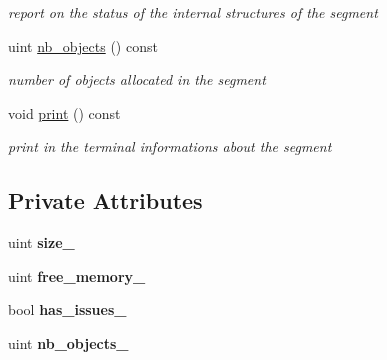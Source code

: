 \begin{DoxyCompactItemize}
\begin{DoxyCompactList}\small\item\em report on the status of the internal structures of the segment \end{DoxyCompactList}\item 
uint \hyperlink{classshared__memory_1_1SegmentInfo_aa1ecf75582e0df02205ad80c2797bc94}{nb\+\_\+objects} () const \hypertarget{classshared__memory_1_1SegmentInfo_aa1ecf75582e0df02205ad80c2797bc94}{}\label{classshared__memory_1_1SegmentInfo_aa1ecf75582e0df02205ad80c2797bc94}

\begin{DoxyCompactList}\small\item\em number of objects allocated in the segment \end{DoxyCompactList}\item 
void \hyperlink{classshared__memory_1_1SegmentInfo_a821eb6fc85451b03ea862e4cf5d6890c}{print} () const \hypertarget{classshared__memory_1_1SegmentInfo_a821eb6fc85451b03ea862e4cf5d6890c}{}\label{classshared__memory_1_1SegmentInfo_a821eb6fc85451b03ea862e4cf5d6890c}

\begin{DoxyCompactList}\small\item\em print in the terminal informations about the segment \end{DoxyCompactList}\end{DoxyCompactItemize}
\subsection*{Private Attributes}
\begin{DoxyCompactItemize}
\item 
uint {\bfseries size\+\_\+}\hypertarget{classshared__memory_1_1SegmentInfo_a87f1d90b4bfefd07945ba0e7d42959f4}{}\label{classshared__memory_1_1SegmentInfo_a87f1d90b4bfefd07945ba0e7d42959f4}

\item 
uint {\bfseries free\+\_\+memory\+\_\+}\hypertarget{classshared__memory_1_1SegmentInfo_ab1b9e3b023e45ccb327e7322d9dde554}{}\label{classshared__memory_1_1SegmentInfo_ab1b9e3b023e45ccb327e7322d9dde554}

\item 
bool {\bfseries has\+\_\+issues\+\_\+}\hypertarget{classshared__memory_1_1SegmentInfo_a727ff0d1a39302da90b26207de2ffc26}{}\label{classshared__memory_1_1SegmentInfo_a727ff0d1a39302da90b26207de2ffc26}

\item 
uint {\bfseries nb\+\_\+objects\+\_\+}\hypertarget{classshared__memory_1_1SegmentInfo_a56992f58b9b7c0bebbbff56d85a95a4b}{}\label{classshared__memory_1_1SegmentInfo_a56992f58b9b7c0bebbbff56d85a95a4b}

\end{DoxyCompactItemize}


